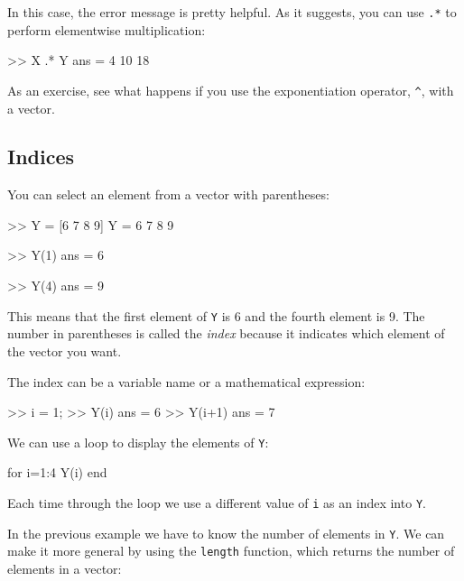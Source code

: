 In this case, the error message is pretty helpful.  As it suggests, you can use {\tt .*} to perform elementwise multiplication:


\begin{code}
>> X .* Y
ans = 4    10    18
\end{code}

As an exercise, see what happens if you use the exponentiation operator,
\verb"^", with a vector.


\subsection{Indices}


You can select an element from a vector with parentheses:

\begin{code}
>> Y = [6 7 8 9]
Y = 6    7     8     9

>> Y(1)
ans = 6

>> Y(4)
ans = 9
\end{code}

This means that the first element of {\tt Y} is 6 and the
fourth element is 9.
The number in parentheses is called the \emph{index} because it indicates which element of the vector you want.


The index can be a variable name or a mathematical expression:

\begin{code}
>> i = 1;
>> Y(i)
ans = 6
>> Y(i+1)
ans = 7
\end{code}

We can use a loop to display the elements of {\tt Y}:


\begin{code}
for i=1:4
     Y(i)
end
\end{code}

Each time through the loop we use a different value of {\tt i}
as an index into {\tt Y}.


In the previous example we have to know the number
of elements in {\tt Y}.  We can make it more general by using
the {\tt length} function, which returns the number of elements
in a vector:

